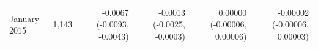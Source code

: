 \begin{tabular}{lrrrrr}
January 2015 & 1,143 & -0.0067 (-0.0093, -0.0043) & -0.0013 (-0.0025, -0.0003) & 0.00000 (-0.00006, 0.00006) & -0.00002 (-0.00006, 0.00003) \\

\end{tabular}
